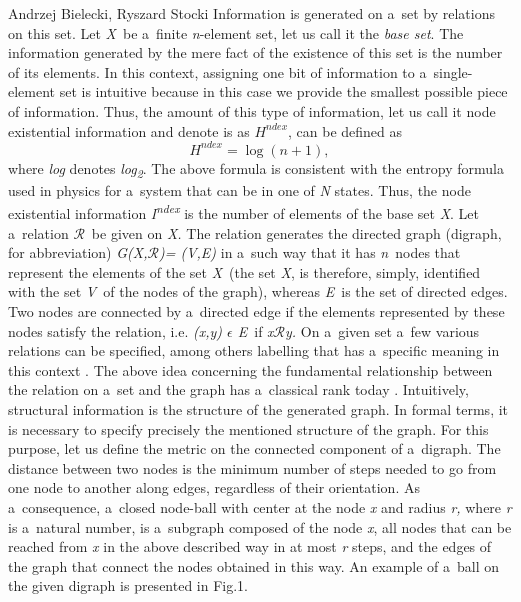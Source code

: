 \begin{artengenv2auth}{Andrzej Bielecki, Ryszard Stocki}
Information is generated on a~set by relations on this set. Let \textit{X}~be a~finite \textit{n}{}-element set, let us call it the \textit{base set}. The information generated by the mere fact of the existence of this set is the number of its elements. In this context, assigning one bit of information to a~single-element set is intuitive because in this case we provide the smallest possible piece of information. Thus, the amount of this type of information, let us call it node existential information and denote is as $H^{\textit{ndex}}$, can be defined as
\begingroup
\reqnos
\begin{equation}
H^{\textit{ndex}}=\log (n+1),
\end{equation}
\endgroup
where \textit{log} denotes \textit{log}\textit{\textsubscript{2}}. The above formula is consistent with the entropy formula used in physics for a~system that can be in one of \textit{N} states. Thus, the node existential information \textit{I}\textit{\textsuperscript{ndex}} is the number of elements of the base set \textit{X}. Let a~relation $\mathcal{R}$~be given on \textit{X.}  The relation generates the directed graph (digraph, for abbreviation) \textit{G(X,$\mathcal{R}$)= (V,E)} in a~such way that it has \textit{n}~nodes that represent the elements of the set \textit{X}~(the set \textit{X}, is therefore, simply, identified with the set \textit{V}~of the nodes of the graph), whereas \textit{E}~is the set of directed edges.  Two nodes are connected by a~directed edge if the elements represented by these nodes satisfy the relation, i.e. \textit{(x,y) $\epsilon $ E}~if \textit{x$\mathcal{R}$y.} On a~given set a~few various relations can be specified, among others labelling that has a~specific meaning in this context 
\parencite[for details see:][]{bielecki_information_2022}. %
 The above idea concerning the fundamental relationship between the relation on a~set and the graph has a~classical rank today 
\parencite[][]{carnap_logische_1928}. %
 Intuitively, structural information is the structure of the generated graph. In formal terms, it is necessary to specify precisely the mentioned structure of the graph. For this purpose, let us define the metric on the connected component of a~digraph. The distance between two nodes is the minimum number of steps needed to go from one node to another along edges, regardless of their orientation. As a~consequence, a~closed node-ball with center at the node \textit{x} and radius \textit{r,} where \textit{r} is a~natural number, is a~subgraph composed of the node \textit{x}, all nodes that can be reached from \textit{x} in the above described way in at most \textit{r} steps, and the edges of the graph that connect the nodes obtained in this way. An example of a~ball on the given digraph is presented in Fig.1.



\end{artengenv2auth}
